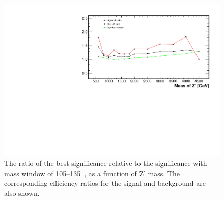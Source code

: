 \begin{figure}[!htb]
  \begin{center}
    \includegraphics[width=.9\textwidth]{figures/ratio.pdf}
  \end{center}
  \caption{The ratio of the best significance relative to the significance 
 with mass window of 105--135~\GeV,  as a function 
of Z' mass. The corresponding efficiency ratios for the signal 
 and background are also shown. }  
  \label{fig:sigratiomass}
\end{figure}


